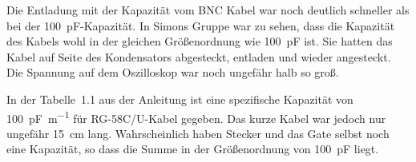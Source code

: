 Die Entladung mit der Kapazität vom BNC Kabel war noch deutlich schneller als
bei der \SI{100}{\pico\farad}-Kapazität. In Simons Gruppe war zu sehen, dass
die Kapazität des Kabels wohl in der gleichen Größenordnung wie
\SI{100}{\pico\farad} ist. Sie hatten das Kabel auf Seite des Kondensators
abgesteckt, entladen und wieder angesteckt. Die Spannung auf dem Oszilloskop
war noch ungefähr halb so groß.

In der Tabelle~1.1 aus der Anleitung ist eine spezifische Kapazität von
\SI{100}{\pico\farad\per\meter} für RG-58C/U-Kabel gegeben. Das kurze Kabel war
jedoch nur ungefähr \SI{15}{\centi\meter} lang. Wahrscheinlich haben Stecker
und das Gate selbst noch eine Kapazität, so dass die Summe in der Größenordnung
von \SI{100}{\pico\farad} liegt.


\FloatBarrier
\IfFileExists{\bibliographyfile}{
	
}{}



